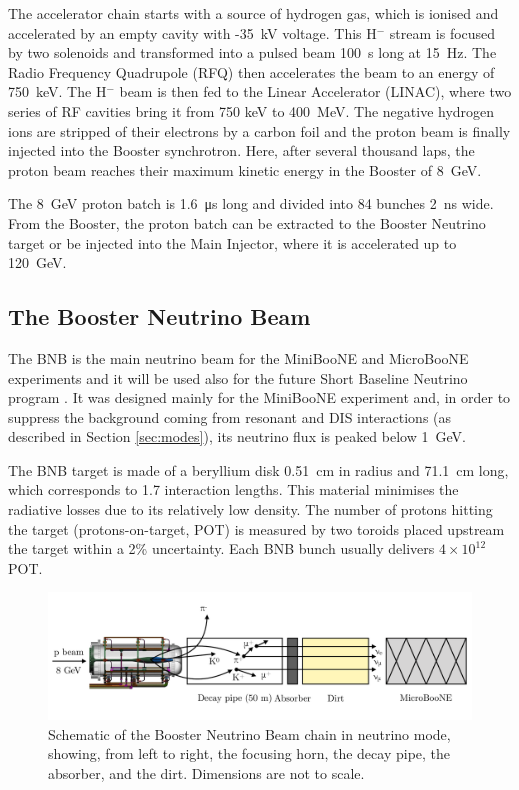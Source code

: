 The accelerator chain starts with a source of hydrogen gas, which is ionised and accelerated by an empty cavity with -35~kV voltage. This H$^-$ stream is focused by two solenoids and transformed into a pulsed beam 100~\si{\micro}s long at 15~Hz. The Radio Frequency Quadrupole (RFQ) then accelerates the beam to an energy of 750~keV. The H$^-$ beam is then fed to the Linear Accelerator (LINAC), where two series of RF cavities bring it from 750 keV to 400~MeV.  The negative hydrogen ions are stripped of their electrons by a carbon foil and the proton beam is finally injected into the Booster synchrotron. Here, after several thousand laps, the proton beam reaches their maximum kinetic energy in the Booster of 8~GeV.

The 8~GeV proton batch is 1.6~\si{\micro\second} long and divided into 84 bunches 2~ns wide. From the Booster, the proton batch can be extracted to the Booster Neutrino target or be injected into the Main Injector, where it is accelerated up to 120~GeV.

\subsection{The Booster Neutrino Beam}
The BNB is the main neutrino beam for the MiniBooNE and MicroBooNE experiments and it will be used also for the future Short Baseline Neutrino program \cite{Antonello:2015lea}. It was designed mainly for the MiniBooNE experiment and, in order to suppress the background coming from resonant and DIS interactions (as described in Section \ref{sec:modes}), its neutrino flux is peaked below 1~GeV.

The BNB target is made of a beryllium disk 0.51~cm in radius and 71.1~cm long, which corresponds to 1.7 interaction lengths. This material minimises the radiative losses due to its relatively low density. The number of protons hitting the target (protons-on-target, POT) is measured by two toroids placed upstream the target within a 2\% uncertainty. Each BNB bunch usually delivers $4\times10^{12}$ POT. 

\begin{figure}[htbp]
    \centering
    \includegraphics[width=0.98\linewidth]{figures/neutrinobeam.pdf}
    \caption{Schematic of the Booster Neutrino Beam chain in neutrino mode, showing, from left to right, the focusing horn, the decay pipe, the absorber, and the dirt. Dimensions are not to scale.}
    \label{fig:neutrinobeam}
\end{figure}

